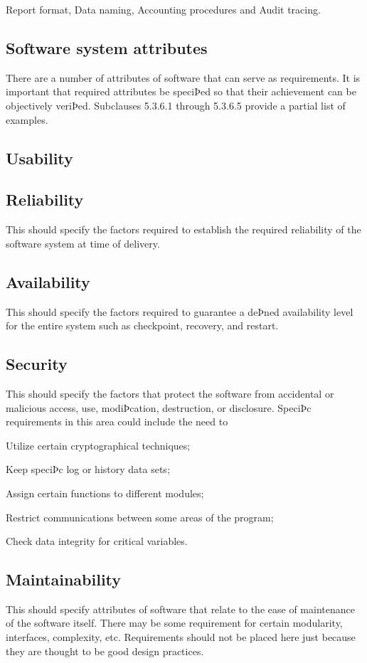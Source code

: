 		Report format, Data naming, Accounting procedures and Audit tracing.
	
	\subsection{Software system attributes}
		There are a number of attributes of software that can serve as requirements. It is important that required attributes be speciÞed so that their achievement can be objectively veriÞed. Subclauses 5.3.6.1 through 5.3.6.5 provide a partial list of examples.
	
	\subsection{Usability}

	\subsection{Reliability}
		This should specify the factors required to establish the required reliability of the software system at time of delivery.
	
	\subsection{Availability}
		This should specify the factors required to guarantee a deÞned availability level for the entire system such as checkpoint, recovery, and restart. 
	
	\subsection{Security}
		This should specify the factors that protect the software from accidental or malicious access, use, modiÞcation, destruction, or disclosure. SpeciÞc requirements in this area could include the need to
		
		Utilize certain cryptographical techniques; 
		
		Keep speciÞc log or history data sets;
		
		Assign certain functions to different modules;
		
		Restrict communications between some areas of the program;
		
		Check data integrity for critical variables.
	
	\subsection{Maintainability}
		This should specify attributes of software that relate to the ease of maintenance of the software itself. There may be some requirement for certain modularity, interfaces, complexity, etc. Requirements should not be placed here just because they are thought to be good design practices.
	
